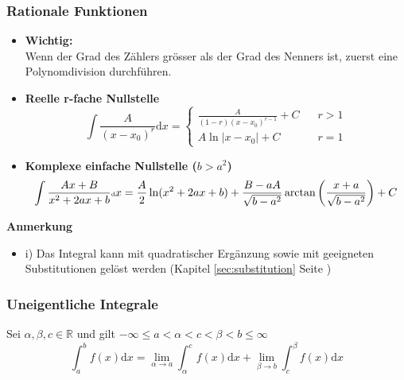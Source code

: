 \documentclass[8pt, a4paper, landscape, fleqn]{scrartcl}
\newenvironment {annotation}[1]
				{\begin{itshape} \begin{small} \textbf{#1} \begin{itemize}}
				{\end{itemize} \end{small} \end{itshape}}
\begin{document}
\begin{multicols*}{3}
				\subsubsection{Rationale Funktionen}
					\label{sec:rational_function}
					\begin{itemize}
					    \item \textbf{Wichtig:}\\
					    Wenn der Grad des Zählers grösser als der Grad des Nenners ist, zuerst eine Polynomdivision durchführen.
						\item \textbf{Reelle r-fache Nullstelle}
						\begin{equation*}
							\int \frac{A}{(x-x_0)^r}\text{d}x=
							\begin{cases}
							\frac{A}{(1-r)(x-x_0)^{r-1}}+C \hspace{10pt} &r>1\\
							A\ln \vert x-x_0 \vert +C &r=1
							\end{cases}
						\end{equation*}
						\item \textbf{Komplexe einfache Nullstelle ($b > a^2$)}
						\begin{equation*}
							\begin{tiny}
								\int \frac{Ax+B}{x^2+2ax+b} \text{d}x=\frac{A}{2} \ln(x^2+2ax+b) +\frac{B-aA}{\sqrt{b-a^2}}\arctan \left(\frac{x+a}{\sqrt{b-a^2}}\right) +C
							\end{tiny}			
						\end{equation*}
					\end{itemize}
					\begin{annotation}{Anmerkung}
						\item [i)] Das Integral kann mit quadratischer Ergänzung sowie mit geeigneten Substitutionen gelöst werden (Kapitel \ref{sec:substitution} Seite \pageref{sec:substitution})
					\end{annotation}
				\subsubsection{Uneigentliche Integrale}
					Sei $\alpha, \beta, c \in \mathbb{R}$ und gilt $-\infty\le a<\alpha<c<\beta<b \le \infty$
					\begin{equation*}
						\int_{a}^{b}f(x)\text{d}x=\lim_{\alpha \rightarrow a} \int_{\alpha}^{c}f(x)\text{d}x+\lim_{\beta \rightarrow b} \int_{c}^{\beta}f(x)\text{d}x
					\end{equation*}
					

\end{multicols*}
\end{document}
